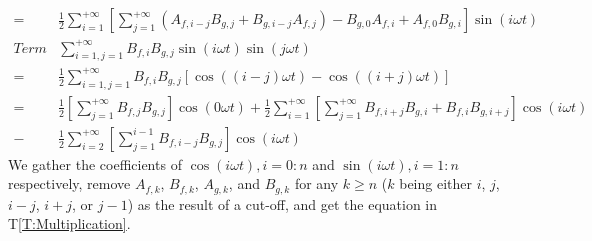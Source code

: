 \documentclass[12pt]{article}
\newcommand{\tref}[1]{T\ref{#1}}
\begin{document}
\begin{equation}
\begin{aligned}
	=&\frac{1}{2}\sum_{i=1}^{+\infty}[\sum_{j=1}^{+\infty}(A_{f,i-j}B_{g,j}+B_{g,i-j}A_{f,j})-B_{g,0}A_{f,i}+A_{f,0}B_{g,i}]\sin(i\omega t)\\
	\textit{Term C:} &\sum_{i=1,j=1}^{+\infty}B_{f,i}B_{g,j}\sin(i\omega t)\sin(j\omega t)\\
	=&\frac{1}{2}\sum_{i=1,j=1}^{+\infty}B_{f,i}B_{g,j}[\cos((i-j)\omega t)-\cos((i+j)\omega t)]\\
	=&\frac{1}{2}[\sum_{j=1}^{+\infty}B_{f,j}B_{g,j}]\cos(0\omega t)+\frac{1}{2}\sum_{i=1}^{+\infty}[\sum_{j=1}^{+\infty}B_{f,i+j}B_{g,i}+B_{f,i}B_{g,i+j}]\cos(i\omega t)\\-&\frac{1}{2}\sum_{i=2}^{+\infty}[\sum_{j=1}^{i-1}B_{f,i-j}B_{g,j}]\cos(i\omega t)
	\end{aligned}
\end{equation}
We gather the coefficients of $\cos(i\omega t), i=0:n$ and $\sin(i\omega t), i=1:n$ respectively, remove $A_{f,k}$, $B_{f,k}$, $A_{g,k}$, and $B_{g,k}$ for any $k\geq n$ ($k$ being either $i$, $j$, $i-j$, $i+j$, or $j-1$) as the result of a cut-off, and get the equation in \tref{T:Multiplication}.
\end{document}
